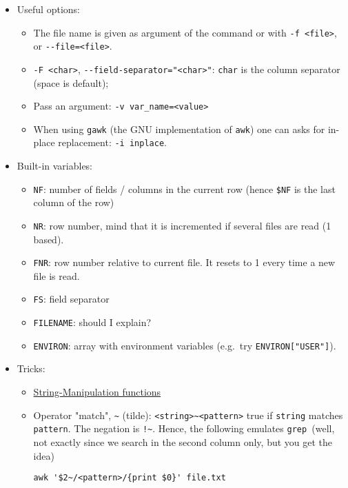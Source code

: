 \documentclass[a4paper,12pt,%
              final%
              ]{article}
\begin{document}
\begin{itemize}
\begin{itemize}
\begin{verbatim}
awk 'BEGIN{print Ciao > "ciao.txt"}' file
\end{verbatim}
      \item \texttt{print} it also prints a new line stamp at the end
      \item \texttt{printf}, very similar to the \texttt{C} function, it can be used to choose the format. Differently from \texttt{print}, it does not insert a new line. E.g. (mind the \verb|\n|)
\begin{verbatim}
awk '{printf "I want %5.2f bananas\n" 1.652}' file
\end{verbatim}
    \end{itemize}
  \item Useful options:
    \begin{itemize}
      \item The file name is given as argument of the command or with \verb|-f <file>|, or \verb|--file=<file>|.
      \item \verb|-F <char>|, \verb|--field-separator="<char>"|: \verb|char| is the column separator (space is default);
      \item Pass an argument: \verb|-v var_name=<value>|
      \item When using \texttt{gawk} (the GNU implementation of \texttt{awk}) one can asks for in-place replacement: \verb|-i inplace|.
    \end{itemize}
  \item Built-in variables:
    \begin{itemize}
      \item \verb|NF|: number of fields / columns in the current row (hence \verb|$NF| is the last column of the row)
      \item \verb|NR|: row number, mind that it is incremented if several files are read (1 based).
      \item \verb|FNR|: row number relative to current file. It resets to 1 every time a new file is read.
      \item \verb|FS|: field separator
      \item \verb|FILENAME|: should I explain?
      \item \verb|ENVIRON|: array with environment variables (e.g.~try \verb|ENVIRON["USER"]|).
    \end{itemize}
  \item Tricks:
    \begin{itemize}
      \item \href{https://www.gnu.org/software/gawk/manual/html_node/String-Functions.html}{String-Manipulation functions}
      \item Operator "match", \verb|~| (tilde): \verb|<string>~<pattern>| true if \verb|string| matches \verb|pattern|. The negation is \verb|!~|. Hence, the following emulates \texttt{grep }(well, not exactly since we search in the second column only, but you get the idea)
\begin{verbatim}
awk '$2~/<pattern>/{print $0}' file.txt
\end{verbatim}
    \end{itemize}
\end{itemize}
\end{document}
